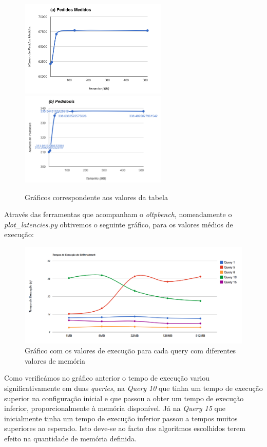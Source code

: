 \begin{figure}[ht!]
\centering
\includegraphics[width=70mm]{img/06_wm_a.png}
\includegraphics[width=70mm]{img/06_wm_b.png}
\caption{Gráficos correspondente aos valores da tabela \label{overflow}}
\end{figure}

Através das ferramentas que acompanham o \textit{oltpbench}, nomeadamente o \textit{plot\_latencies.py} obtivemos o seguinte gráfico, para os valores médios de execução:

\begin{figure}[ht!]
\centering
\includegraphics[width=\textwidth]{img/06_wm_c.png}
\caption{Gráfico com os valores de execução para cada query com diferentes valores de memória\label{overflow}}
\end{figure}

Como verificámos no gráfico anterior o tempo de execução variou significativamente em duas \textit{queries}, na \textit{Query 10} que tinha um tempo de execução superior na configuração inicial e que passou a obter um tempo de execução inferior, proporcionalmente à memória disponível. Já na \textit{Query 15} que inicialmente tinha um tempo de execução inferior passou a tempos muitos superiores ao esperado. Isto deve-se ao facto dos algoritmos escolhidos terem efeito na quantidade de memória definida.

